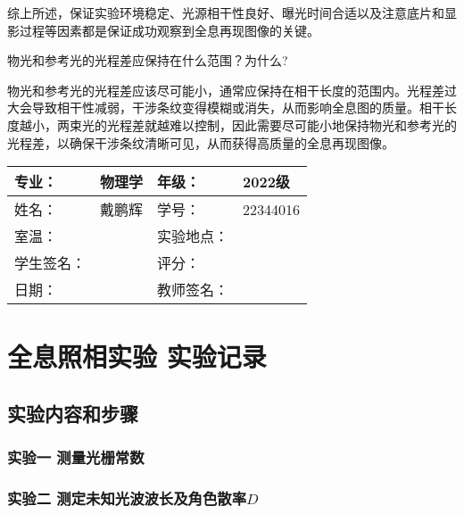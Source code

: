 \documentclass[dvipsnames, svgnames,a4paper,11pt]{article}
\begin{document}
		综上所述，保证实验环境稳定、光源相干性良好、曝光时间合适以及注意底片和显影过程等因素都是保证成功观察到全息再现图像的关键。
		
		
		
		

	\begin{question}
		物光和参考光的光程差应保持在什么范围？为什么?
	\end{question}
		
	物光和参考光的光程差应该尽可能小，通常应保持在相干长度的范围内。光程差过大会导致相干性减弱，干涉条纹变得模糊或消失，从而影响全息图的质量。相干长度越小，两束光的光程差就越难以控制，因此需要尽可能小地保持物光和参考光的光程差，以确保干涉条纹清晰可见，从而获得高质量的全息再现图像。

\clearpage
\begin{table}
	\renewcommand\arraystretch{1.7}
	\centering
	\begin{tabularx}{\textwidth}{|X|X|X|X|}
	\hline
	专业：& 物理学 &年级：& 2022级 \\
	\hline
	姓名：& 戴鹏辉 & 学号：& 22344016 \\
	\hline
	室温：&  & 实验地点： &  \\
	\hline
	学生签名：& & 评分： &\\
	\hline
	日期：&  & 教师签名：&\\
	\hline
	\end{tabularx}
\end{table}

\section{全息照相实验 \quad\heiti 实验记录}
\subsection{实验内容和步骤}

	\subsubsection{实验一 测量光栅常数}
	
	
	\subsubsection{实验二 测定未知光波波长及角色散率$D$}

		

\end{document}
